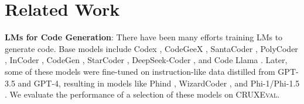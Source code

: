 \documentclass{article}
\newcommand{\benchmark}{\textsc{CRUXEval}\xspace}
\newcommand{\benchmarki}{\textsc{CRUXEval-I}\xspace}
\newcommand{\benchmarko}{\textsc{CRUXEval-O}\xspace}
\theoremstyle{plain}
\theoremstyle{definition}
\theoremstyle{remark}
\begin{document}



\section{Related Work} \label{sec:related-work}

\noindent \textbf{LMs for Code Generation}: There have been many efforts training LMs to generate code. Base models include Codex \citep{chen2021evaluating}, CodeGeeX \citep{zheng2023codegeex}, SantaCoder \citep{allal2023santacoder}, PolyCoder \citep{xu2022systematic}, InCoder \citep{fried2022incoder}, CodeGen \citep{nijkamp2022codegen}, StarCoder \citep{li2023starcoder}, DeepSeek-Coder \citep{deepseek-coder}, and Code Llama \citep{roziere2023code}. Later, some of these models were fine-tuned on instruction-like data distilled from GPT-3.5 and GPT-4, resulting in models like Phind \citep{Phind}, WizardCoder \citep{luo2023wizardcoder}, and Phi-1/Phi-1.5 \citep{li2023textbooks, gunasekar2023textbooks}. We evaluate the performance of a selection of these models on \benchmark.
\end{document}
